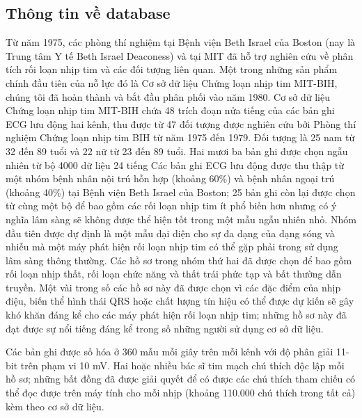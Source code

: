 \subsection{Thông tin về database}
Từ năm 1975, các phòng thí nghiệm tại Bệnh viện Beth Israel của Boston (nay là Trung tâm Y tế Beth Israel Deaconess) và tại MIT đã hỗ trợ nghiên cứu về phân tích rối loạn nhịp tim và các đối tượng liên quan. Một trong những sản phẩm chính đầu tiên của nỗ lực đó là Cơ sở dữ liệu Chứng loạn nhịp tim MIT-BIH, chúng tôi đã hoàn thành và bắt đầu phân phối vào năm 1980.\cite{mitbih}
Cơ sở dữ liệu Chứng loạn nhịp tim MIT-BIH chứa 48 trích đoạn nửa tiếng của các bản ghi ECG lưu động hai kênh, thu được từ 47 đối tượng được nghiên cứu bởi Phòng thí nghiệm Chứng loạn nhịp tim BIH từ năm 1975 đến 1979. Đối tượng là 25 nam từ 32 đến 89 tuổi và 22 nữ từ 23 đến 89 tuổi. Hai mươi ba bản ghi được chọn ngẫu nhiên từ bộ 4000 dữ liệu 24 tiếng Các bản ghi ECG lưu động  được thu thập từ một nhóm bệnh nhân nội trú hỗn hợp (khoảng 60\%) và bệnh nhân ngoại trú (khoảng 40\%) tại Bệnh viện Beth Israel của Boston; 25 bản ghi còn lại được chọn từ cùng một bộ để bao gồm các rối loạn nhịp tim ít phổ biến hơn nhưng có ý nghĩa lâm sàng sẽ không được thể hiện tốt trong một mẫu ngẫu nhiên nhỏ.
Nhóm đầu tiên được dự định là một mẫu đại diện cho sự đa dạng của dạng sóng và nhiễu mà một máy phát hiện rối loạn nhịp tim có thể gặp phải trong sử dụng lâm sàng thông thường. Các hồ sơ trong nhóm thứ hai đã được chọn để bao gồm rối loạn nhịp thất, rối loạn chức năng và thất trái phức tạp và bất thường dẫn truyền. Một vài trong số các hồ sơ này đã được chọn vì các đặc điểm của nhịp điệu, biến thể hình thái QRS hoặc chất lượng tín hiệu có thể được dự kiến sẽ gây khó khăn đáng kể cho các máy phát hiện rối loạn nhịp tim; những hồ sơ này đã đạt được sự nổi tiếng đáng kể trong số những người sử dụng cơ sở dữ liệu.

Các bản ghi được số hóa ở 360 mẫu mỗi giây trên mỗi kênh với độ phân giải 11-bit trên phạm vi 10 mV. Hai hoặc nhiều bác sĩ tim mạch chú thích độc lập mỗi hồ sơ; những bất đồng đã được giải quyết để có được các chú thích tham chiếu có thể đọc được trên máy tính cho mỗi nhịp (khoảng 110.000 chú thích trong tất cả) kèm theo cơ sở dữ liệu.
